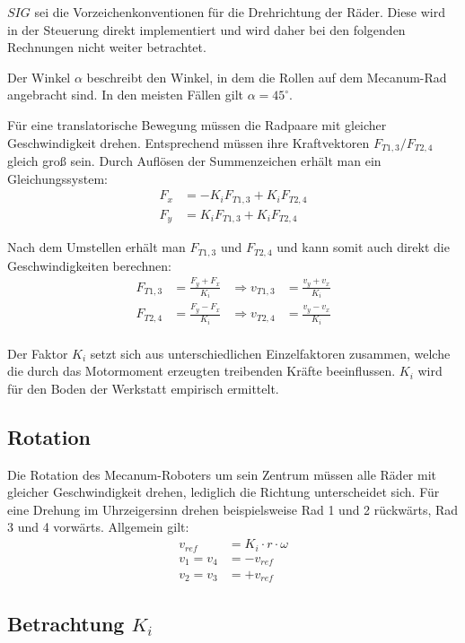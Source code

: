 $SIG$ sei die Vorzeichenkonventionen für die Drehrichtung der Räder.
Diese wird in der Steuerung direkt implementiert und wird daher bei den folgenden Rechnungen nicht weiter betrachtet.

Der Winkel $\alpha$ beschreibt den Winkel, in dem die Rollen auf dem Mecanum-Rad angebracht sind.
In den meisten Fällen gilt $\alpha = 45^\circ$.

Für eine translatorische Bewegung müssen die Radpaare mit gleicher Geschwindigkeit drehen.
Entsprechend müssen ihre Kraftvektoren $F_{T1, 3} / F_{T2, 4}$ gleich groß sein.
Durch Auflösen der Summenzeichen erhält man ein Gleichungssystem:
\begin{align*}
    F_x &= - K_i F_{T1, 3} + K_i F_{T2, 4} \\
    F_y &= K_i F_{T1, 3}   + K_i F_{T2, 4}
\end{align*}

Nach dem Umstellen erhält man $F_{T1, 3}$ und $F_{T2, 4}$ und kann somit auch direkt die Geschwindigkeiten berechnen:
\begin{align*}
    F_{T1, 3} &= \frac{F_y + F_x}{K_i} &\Rightarrow v_{T1, 3} &= \frac{v_y + v_x}{K_i} \\
    F_{T2, 4} &= \frac{F_y - F_x}{K_i} &\Rightarrow v_{T2, 4} &= \frac{v_y - v_x}{K_i} \\
\end{align*}

Der Faktor $K_i$ setzt sich aus unterschiedlichen Einzelfaktoren zusammen, welche die durch das Motormoment erzeugten treibenden Kräfte beeinflussen. $K_i$ wird für den Boden der Werkstatt empirisch ermittelt.


\subsection{Rotation}
\label{sec:Rotation}
Die Rotation des Mecanum-Roboters um sein Zentrum müssen alle Räder mit gleicher Geschwindigkeit drehen, lediglich die Richtung unterscheidet sich.
Für eine Drehung im Uhrzeigersinn drehen beispielsweise Rad 1 und 2 rückwärts, Rad 3 und 4 vorwärts. Allgemein gilt:
\begin{align*}
    v_{ref} &= K_i \cdot r \cdot \omega \\
    v_1 = v_4 &= - v_{ref} \\
    v_2 = v_3 &= + v_{ref}
\end{align*}

\subsection{Betrachtung $K_i$}
\label{sec:k-faktor}


